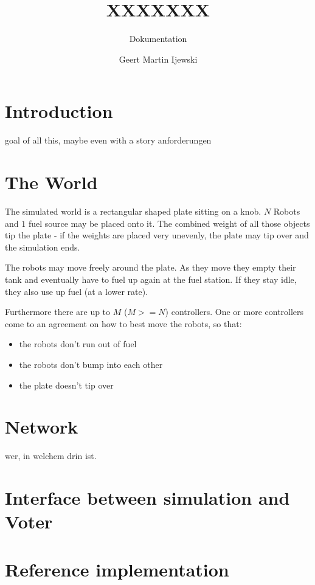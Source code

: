 \documentclass[
    12pt,
    bibliography=totoc,
]{scrartcl}
\title{XXXXXXX}
\subtitle{Dokumentation}
\author{Geert Martin Ijewski}
\begin{document}
\maketitle
\thispagestyle{empty}

\clearpage
\tableofcontents
\listoffigures
\listoftables

\clearpage
\section{Introduction}
goal of all this, maybe even with a story
anforderungen

\clearpage
\section{The World}
The simulated world is a rectangular shaped plate sitting on a knob. $N$ Robots and $1$ fuel source may be placed
onto it. The combined weight of all those objects tip the plate - if the weights are placed very unevenly, 
the plate may tip over and the simulation ends.

The robots may move freely around the plate. As they move they empty their tank and eventually have to fuel up
again at the fuel station. If they stay idle, they also use up fuel (at a lower rate).

Furthermore there are up to $M$ ($M >= N$) controllers. One or more controllers come to an agreement on how to best
move the robots, so that:
\begin{itemize}
\item the robots don't run out of fuel
\item the robots don't bump into each other
\item the plate doesn't tip over
\end{itemize}

\clearpage
\section{Network}
wer, in welchem drin ist. 

\clearpage
\section{Interface between simulation and Voter}

\clearpage
\section{Reference implementation}
\end{document}
